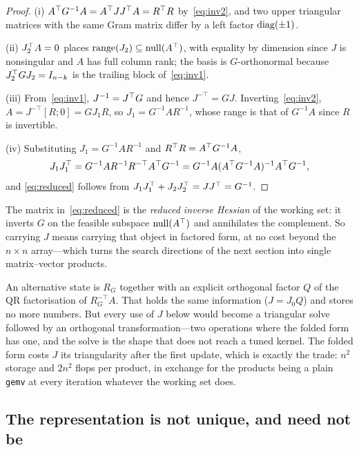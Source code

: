 \begin{proof}
(i) $A^{\top} G^{-1} A = A^{\top} J J^{\top} A = R^{\top} R$ by~\eqref{eq:inv2}, and two upper
triangular matrices with the same Gram matrix differ by a left factor
$\operatorname{diag}(\pm1)$.

(ii) $J_2^{\top} A = 0$ places $\operatorname{range}(J_2) \subseteq \operatorname{null}(A^{\top})$, with equality by
dimension since $J$ is nonsingular and $A$ has full column rank; the basis is
$G$-orthonormal because $J_2^{\top} G J_2 = I_{n-k}$ is the trailing block
of~\eqref{eq:inv1}.

(iii) From~\eqref{eq:inv1}, $J^{-1} = J^{\top} G$ and hence $J^{-\top} = G J$.
Inverting~\eqref{eq:inv2}, $A = J^{-\top}[R;0] = G J_1 R$, so
$J_1 = G^{-1}AR^{-1}$, whose range is that of $G^{-1}A$ since $R$ is invertible.

(iv) Substituting $J_1 = G^{-1}AR^{-1}$ and $R^{\top} R = A^{\top} G^{-1}A$,
\[
  J_1 J_1^{\top} = G^{-1}A R^{-1} R^{-\top} A^{\top} G^{-1}
            = G^{-1}A (A^{\top} G^{-1}A)^{-1} A^{\top} G^{-1},
\]
and \eqref{eq:reduced} follows from $J_1J_1^{\top} + J_2J_2^{\top} = JJ^{\top} = G^{-1}$.
\end{proof}

The matrix in~\eqref{eq:reduced} is the \emph{reduced inverse Hessian} of the
working set: it inverts $G$ on the feasible subspace $\operatorname{null}(A^{\top})$ and annihilates
the complement. So carrying $J$ means carrying that object in factored form, at no
cost beyond the $n\times n$ array---which turns the search directions of the next
section into single matrix--vector products.

\begin{remark}
An alternative state is $R_G$ together with an explicit orthogonal factor $Q$ of the
QR factorisation of $R_G^{-\top}A$. That holds the same information ($J = J_0Q$) and
stores no more numbers. But every use of $J$ below would become a triangular solve
followed by an orthogonal transformation---two operations where the folded form has
one, and the solve is the shape that does not reach a tuned kernel. The folded form
costs $J$ its triangularity after the first update, which is exactly the trade:
$n^2$ storage and $2n^2$ flops per product, in exchange for the products being a
plain \texttt{gemv} at every iteration whatever the working set does.
\end{remark}

\subsection{The representation is not unique, and need not be}

